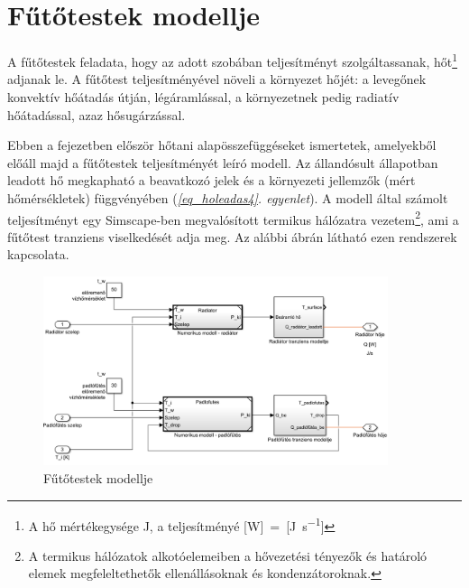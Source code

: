 \chapter{Fűtőtestek modellje}\label{chap:futotest}

A fűtőtestek feladata, hogy az adott szobában teljesítményt szolgáltassanak, hőt\footnote{A hő mértékegysége \si{\joule}, a teljesítményé [\si{\watt}]~=~[\si[per-mode=fraction]{\joule\per\second}]} adjanak le. A fűtőtest teljesítményével növeli a környezet hőjét:
a levegőnek konvektív hőátadás útján, légáramlással, a környezetnek pedig radiatív hőátadással, azaz hősugárzással.

Ebben a fejezetben először hőtani alapösszefüggéseket ismertetek, amelyekből előáll majd a fűtőtestek teljesítményét leíró modell. Az állandósult állapotban leadott hő megkapható a beavatkozó jelek és a környezeti jellemzők (mért hőmérsékletek) függvényében (\textit{\ref{eq_holeadas4}. egyenlet}).
A modell által számolt teljesítményt egy Simscape-ben megvalósított termikus hálózatra vezetem\footnote{A termikus hálózatok alkotóelemeiben a hővezetési tényezők és határoló elemek megfeleltethetők ellenállásoknak és kondenzátoroknak.}, ami a fűtőtest tranziens viselkedését adja meg. Az alábbi ábrán látható ezen rendszerek kapcsolata. 

\begin{figure}[H]
	\centering
	\includegraphics[trim=0 0 0 0, clip,width=0.9\textwidth]{figures/simscape/heatsys}
	\caption{Fűtőtestek modellje}
	\label{fig:SimscapeHeatSys}
\end{figure}



